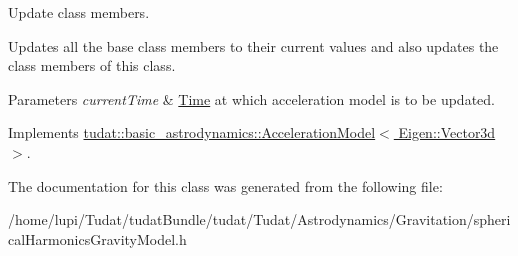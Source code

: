Update class members. 

Updates all the base class members to their current values and also updates the class members of this class. 
\begin{DoxyParams}{Parameters}
{\em current\+Time} & \hyperlink{classtudat_1_1Time}{Time} at which acceleration model is to be updated. \\
\hline
\end{DoxyParams}


Implements \hyperlink{classtudat_1_1basic__astrodynamics_1_1AccelerationModel_a966e85b72300b8cbc99ba60e40108d71}{tudat\+::basic\+\_\+astrodynamics\+::\+Acceleration\+Model$<$ Eigen\+::\+Vector3d $>$}.



The documentation for this class was generated from the following file\+:\begin{DoxyCompactItemize}
\item 
/home/lupi/\+Tudat/tudat\+Bundle/tudat/\+Tudat/\+Astrodynamics/\+Gravitation/spherical\+Harmonics\+Gravity\+Model.\+h\end{DoxyCompactItemize}
